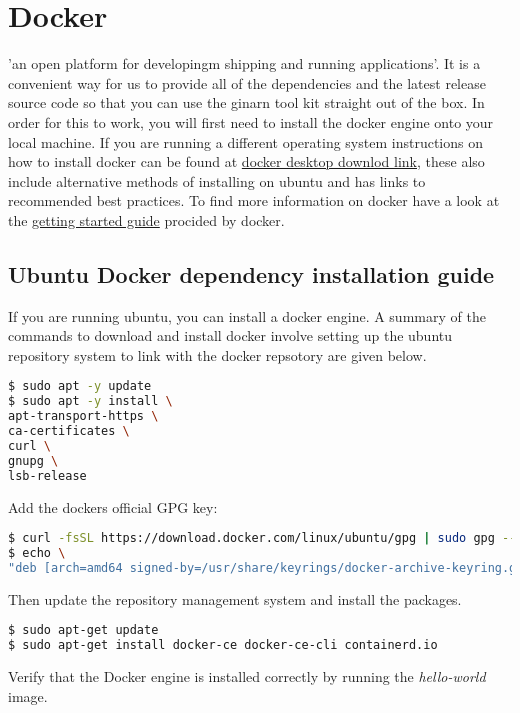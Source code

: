 \chapter{Docker}
\label{ch:docker}
 'an open platform for developingm shipping and running applications'. It is a convenient way for us to provide all of the dependencies and the latest release source code so that you can use the ginarn tool kit straight out of the box.
%
In order for this to work, you will first need to install the docker engine onto your local machine. If you are running a different operating system instructions on how to install docker can be found at \href{https://docs.docker.com/get-docker/}{docker desktop downlod link}, these also include alternative methods of installing on ubuntu and has links to recommended best practices.
%
To find more information on docker have a look at the \href{https://docs.docker.com/get-started/}{getting started guide} procided by docker.
%
\section{Ubuntu Docker dependency installation guide}
If you are running ubuntu, you can install a docker engine. A summary of the commands to download and install docker involve setting up the ubuntu repository system to link with the docker repsotory are given below.

\begin{lstlisting}[language=bash]
$ sudo apt -y update
$ sudo apt -y install \
apt-transport-https \
ca-certificates \
curl \
gnupg \
lsb-release
\end{lstlisting}

Add the dockers official GPG key:
\begin{lstlisting}[language=bash]
$ curl -fsSL https://download.docker.com/linux/ubuntu/gpg | sudo gpg --dearmor -o /usr/share/keyrings/docker-archive-keyring.gpg
$ echo \
"deb [arch=amd64 signed-by=/usr/share/keyrings/docker-archive-keyring.gpg] https://download.docker.com/linux/ubuntu $(lsb_release -cs) stable" | sudo tee /etc/apt/sources.list.d/docker.list > /dev/null
\end{lstlisting}
%
Then update the repository management system and install the packages.
%
\begin{lstlisting}[language=bash]
$ sudo apt-get update
$ sudo apt-get install docker-ce docker-ce-cli containerd.io
\end{lstlisting}

Verify that the Docker engine is installed correctly by running the \emph{hello-world} image.

